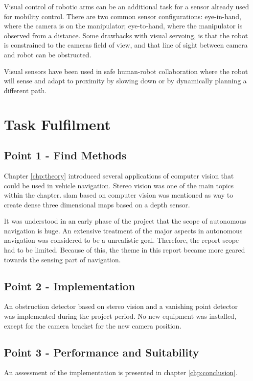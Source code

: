 Visual control of robotic arms can be an additional task for a sensor already used for mobility control. There are two common sensor configurations: eye-in-hand, where the camera is on the manipulator; eye-to-hand, where the manipulator is observed from a distance. Some drawbacks with visual servoing, is that the robot is constrained to  the cameras field of view, and that line of sight between camera and robot can be obstructed.

Visual sensors have been used in safe human-robot collaboration where the robot will sense and adapt to proximity by slowing down or by dynamically planning a different path\cite{sintefKinect}.

\section{Task Fulfilment}
 
\subsection{Point 1 - Find Methods}
Chapter \ref{chp:theory} introduced several applications of computer vision that could be used in vehicle navigation. Stereo vision was one of the main topics within the chapter. \gls{slam} based on computer vision was mentioned as way to create dense three dimensional maps based on a depth sensor. 

It was understood in an early phase of the project that the scope of autonomous navigation is huge. An extensive treatment of the major aspects in autonomous navigation was considered to be a unrealistic goal. Therefore, the report scope had to be limited. Because of this, the theme in this report became more geared towards the sensing part of navigation. 
 
\subsection{Point 2 - Implementation}
An obstruction detector based on stereo vision and a vanishing point detector was implemented during the project period. No new equipment was installed, except for the camera bracket for the new camera position.  
 
\subsection{Point 3 -  Performance and Suitability}

An assessment of the implementation is presented in chapter \ref{chp:conclusion}. 
 
